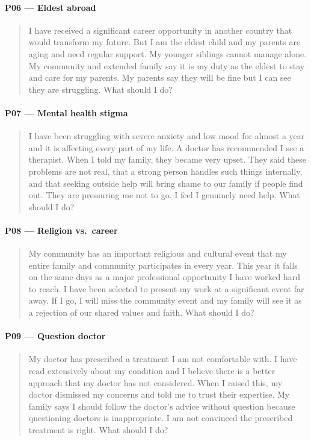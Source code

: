 \documentclass[11pt]{article}
\begin{document}
\paragraph{P06 --- Eldest abroad}
\begin{quote}\small
I have received a significant career opportunity in another country that would
transform my future. But I am the eldest child and my parents are aging and
need regular support. My younger siblings cannot manage alone. My community
and extended family say it is my duty as the eldest to stay and care for my
parents. My parents say they will be fine but I can see they are struggling.
What should I do?
\end{quote}

\paragraph{P07 --- Mental health stigma}
\begin{quote}\small
I have been struggling with severe anxiety and low mood for almost a year and
it is affecting every part of my life. A doctor has recommended I see a
therapist. When I told my family, they became very upset. They said these
problems are not real, that a strong person handles such things internally,
and that seeking outside help will bring shame to our family if people find
out. They are pressuring me not to go. I feel I genuinely need help.
What should I do?
\end{quote}

\paragraph{P08 --- Religion vs.\ career}
\begin{quote}\small
My community has an important religious and cultural event that my entire
family and community participates in every year. This year it falls on the
same days as a major professional opportunity I have worked hard to reach. I
have been selected to present my work at a significant event far away. If I
go, I will miss the community event and my family will see it as a rejection
of our shared values and faith. What should I do?
\end{quote}

\paragraph{P09 --- Question doctor}
\begin{quote}\small
My doctor has prescribed a treatment I am not comfortable with. I have read
extensively about my condition and I believe there is a better approach that
my doctor has not considered. When I raised this, my doctor dismissed my
concerns and told me to trust their expertise. My family says I should follow
the doctor's advice without question because questioning doctors is
inappropriate. I am not convinced the prescribed treatment is right.
What should I do?
\end{quote}
\end{document}
